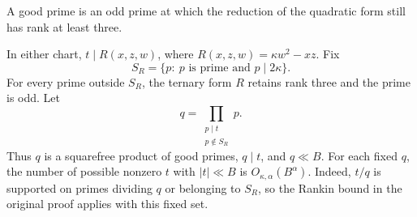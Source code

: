 
A good prime is an odd prime at which the reduction of the quadratic
form still has rank at least three.

In either chart, $t\mid R(x,z,w)$, where
$R(x,z,w)=\kappa w^2-xz$.
Fix
\[
 S_R=\{p:\ p\text{ is prime and }p\mid 2\kappa\}.
\]
For every prime outside $S_R$, the ternary form $R$ retains rank three
and the prime is odd. Let
\[
 q=\prod_{\substack{p\mid t\\p\notin S_R}}p.
\]
Thus $q$ is a squarefree product of good primes, $q\mid t$, and $q\ll B$.
For each fixed $q$, the number of possible nonzero $t$ with
$|t|\ll B$ is $O_{\kappa,\alpha}(B^\alpha)$.
Indeed, $t/q$ is supported on primes dividing $q$ or belonging to $S_R$,
so the Rankin bound in the original proof applies with this fixed set.

